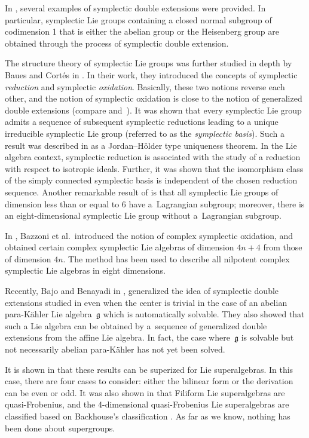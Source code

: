 \documentclass[10pt,a4paper]{amsart}
\numberwithin{equation}{section}
\begin{document}
In \cite{DM1}, several examples of symplectic double extensions were provided. In particular, symplectic Lie groups containing a closed normal subgroup of codimension 1 that is either the abelian group or the Heisenberg group are obtained through the process of symplectic double extension.

The structure theory of symplectic Lie groups was further studied in depth by Baues and Cort\'es in \cite{BC}. In their work, they introduced the concepts of symplectic {\it reduction} and symplectic {\it oxidation}. Basically, these two notions reverse each other, and the notion of symplectic oxidation is close to the notion of generalized double extensions (compare \cite[Section 2.3]{BC} and~\cite[Th\'eor\`eme~2.7]{DM1}). It was shown that every symplectic Lie group admits a sequence of subsequent symplectic reductions leading to a unique irreducible symplectic Lie group (referred to as the {\it symplectic basis}). Such a result was described in \cite{BC} as a Jordan--H\"older type uniqueness theorem. In the Lie algebra context, symplectic reduction is associated with the study of a reduction with respect to isotropic ideals. Further, it was shown that the isomorphism class of the simply connected symplectic basis is independent of the chosen reduction sequence. Another remarkable result of \cite{BC} is that all symplectic Lie groups of dimension less than or equal to 6 have a~Lagrangian subgroup; moreover, there is an eight-dimensional symplectic Lie group without a~Lagrangian subgroup.

In \cite{BFLM}, Bazzoni et al.\ introduced the notion of complex symplectic oxidation, and obtained certain complex symplectic Lie algebras of dimension $4n +4$ from those of dimension $4n$. The method has been used to describe all nilpotent complex symplectic Lie algebras in eight dimensions.

Recently, Bajo and Benayadi in \cite{BaBe}, generalized the idea of symplectic double extensions studied in \cite{DM2} even when the center is trivial in the case of an abelian para-K\"ahler Lie algebra~$\mathfrak{g}$ which is automatically solvable. They also showed that such a Lie algebra can be obtained by a~sequence of generalized double extensions from the affine Lie algebra. In fact, the case where~$\mathfrak{g}$ is solvable but not necessarily abelian para-K\"ahler has not yet been solved.

It is shown in \cite{BM} that these results can be superized for Lie superalgebras. In this case, there are four cases to consider: either the bilinear form or the derivation can be even or odd. It was also shown in \cite{BM} that Filiform Lie superalgebras are quasi-Frobenius, and the 4-dimensional quasi-Frobenius Lie superalgebras are classified based on Backhouse's classification \cite{Ba}. As far as we know, nothing has been done about supergroups.
\end{document}
